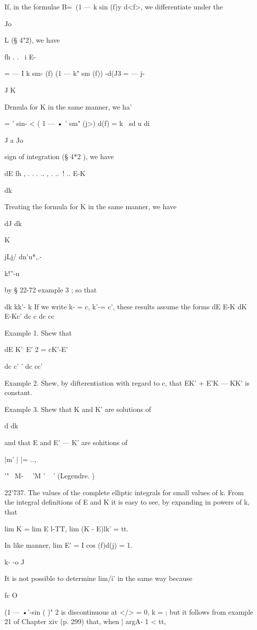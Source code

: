 If, in the formulae B=\ (1 — k sin (f)y d<f>, we differentiate under
the

Jo

L (§ 4"2), we have

fh . . \ i E-

= — I k sm- (f) (1 — k" sm (f)) -d(J3 = — j-

J K

Drmula for K in the same manner, we ha'

= ' sin- < ( 1 — • ' sm" (j>) d(f) = k \ sd u di

J a Jo

sign of integration (§ 4*2 ), we have

dE fh , . . . .. , . ..\ ! .. E-K

dk

Treating the formula for K in the same manner, we have

dJ dk

K

jLj/ dn'u*,.-

k!''-u

by § 22-72 example 3 ; so that

dk kk'- k If we write k- = c, k'-= c', these results assume the forms
dE E-K dK E-Kc' dc c dc cc

Example 1. Shew that

 dE K'~E' 2 = cK'-E'

dc c' ' dc cc'

Example 2. Shew, by difterentiation with regard to c, that EK' + E'K —
KK' is constant.

Example 3. Shew that K and K' are solutions of

d dk

and that E and E' — K' are sohitions of

|m' | |= ..,

 '" ~M- \ \ 'M ' ~ ' (Legendre. )

22'737. The values of the complete elliptic integrals for small values
of k. From the integral definitions of E and K it is easy to see, by
expanding in powers of k, that

lim K = lim E l-TT, lim (K - E)lk' = tt.

In like manner, lim E' = I cos (f)d(j) = 1.

k- -o J

It is not possible to determine lim/i' in the same way because

fc O

(1 — •'-sin ( )" 2 is discontinuous at </> = 0, k = ; but it follows
from example 21 of Chapter xiv (p. 299) that, when | argA- 1 < tt,


